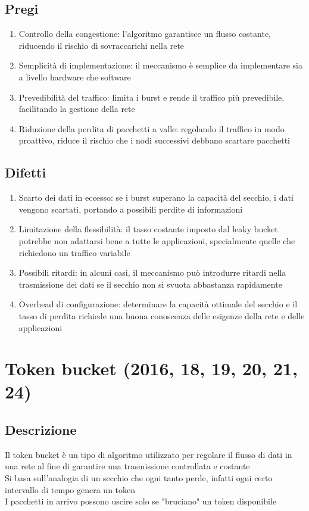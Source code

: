 \documentclass[10pt,oneside,a4paper]{article}
\begin{document}
\subsection{Pregi}
\begin{enumerate}
    \item Controllo della congestione: l'algoritmo garantisce un flusso costante, riducendo il rischio di sovraccarichi nella rete
    \item Semplicità di implementazione: il meccanismo è semplice da implementare sia a livello hardware che software
    \item Prevedibilità del traffico: limita i burst e rende il traffico più prevedibile, facilitando la gestione della rete
    \item Riduzione della perdita di pacchetti a valle: regolando il traffico in modo proattivo, riduce il rischio che i nodi successivi debbano scartare pacchetti
\end{enumerate}
\subsection{Difetti}
\begin{enumerate}
    \item Scarto dei dati in eccesso: se i burst superano la capacità del secchio, i dati vengono scartati, portando a possibili perdite di informazioni
    \item Limitazione della flessibilità: il tasso costante imposto dal leaky bucket potrebbe non adattarsi bene a tutte le applicazioni, specialmente quelle che richiedono un traffico variabile
    \item Possibili ritardi: in alcuni casi, il meccanismo può introdurre ritardi nella trasmissione dei dati se il secchio non si svuota abbastanza rapidamente
    \item Overhead di configurazione: determinare la capacità ottimale del secchio e il tasso di perdita richiede una buona conoscenza delle esigenze della rete e delle applicazioni
\end{enumerate}
\section{Token bucket (2016, 18, 19, 20, 21, 24)}
\subsection{Descrizione}
Il token bucket è un tipo di algoritmo utilizzato per regolare il flusso di dati in una rete al fine di garantire una trasmissione controllata e costante\\
Si basa sull'analogia di un secchio che ogni tanto perde, infatti ogni certo intervallo di tempo genera un token\\
I pacchetti in arrivo possono uscire solo se "bruciano" un token disponibile
\end{document}
